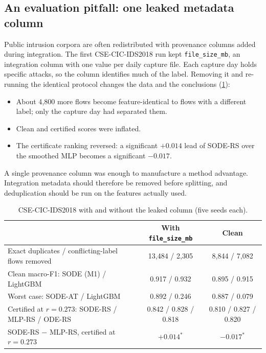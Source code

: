 \subsection{An evaluation pitfall: one leaked metadata column}\label{app:leak}
Public intrusion corpora are often redistributed with provenance columns added
during integration. The first CSE-CIC-IDS2018 run kept \texttt{file\_size\_mb}, an integration column
with one value per daily capture file. Each capture day holds specific attacks,
so the column identifies much of the label. Removing it and re-running the
identical protocol changes the data and the conclusions (\cref{tab:leak}):
\begin{itemize}
\item About 4{,}800 more flows become feature-identical to flows with a different
label; only the capture day had separated them.
\item Clean and certified scores were inflated.
\item The certificate ranking reversed: a significant $+0.014$ lead of SODE-RS
over the smoothed MLP becomes a significant $-0.017$.
\end{itemize}
A single provenance column was enough to manufacture a method advantage.
Integration metadata should therefore be removed before splitting, and
deduplication should be run on the features actually used.

\begin{table}[t]
\caption{CSE-CIC-IDS2018 with and without the leaked column (five seeds each).}
\label{tab:leak}
\centering\small
\begin{tabular}{lcc}
\toprule
& With \texttt{file\_size\_mb} & Clean\\
\midrule
Exact duplicates / conflicting-label flows removed & 13{,}484 / 2{,}305 & 8{,}844 / 7{,}082\\
Clean macro-F1: SODE (M1) / LightGBM & 0.917 / 0.932 & 0.895 / 0.915\\
Worst case: SODE-AT / LightGBM & 0.892 / 0.246 & 0.887 / 0.079\\
Certified at $r=0.273$: SODE-RS / MLP-RS / ODE-RS & 0.842 / 0.828 / 0.818 & 0.810 / 0.827 / 0.820\\
SODE-RS $-$ MLP-RS, certified at $r=0.273$ & $+0.014^{*}$ & $-0.017^{*}$\\
\bottomrule
\end{tabular}
\end{table}


